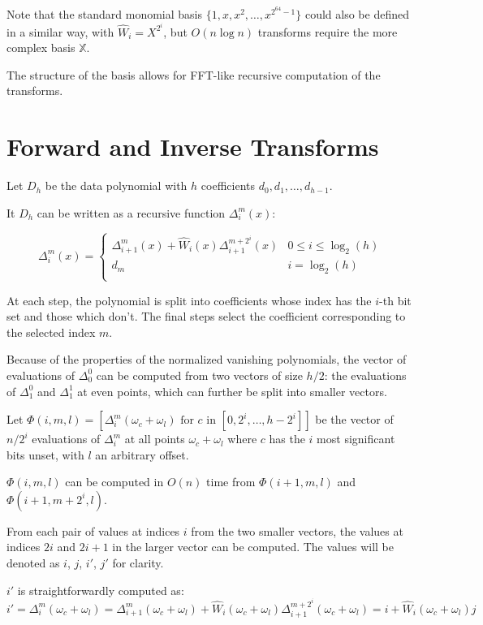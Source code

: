 Note that the standard monomial basis $\{1, x, x^2, \ldots, x^{2^{64} - 1}\}$ could also be defined in a similar way, with $\hat{W}_i = X^{2^{i}}$, but $O(n \log n)$ transforms require the more complex basis $\mathbb{X}$.

The structure of the basis allows for FFT-like recursive computation of the transforms.

\section{Forward and Inverse Transforms}

Let $D_h$ be the data polynomial with $h$ coefficients $d_0, d_1, \ldots, d_{h - 1}$.

It $D_h$ can be written as a recursive function $\Delta_i^m(x)$:

\[
\Delta_i^m(x) = \begin{cases}
    \Delta_{i+1}^m(x) + \hat{W}_i(x) \Delta_{i+1}^{m+2^i}(x) & 0 \leq i \le \log_2(h) \\
    d_m & i = \log_2(h) \\
    \end{cases}
\]

At each step, the polynomial is split into coefficients whose index has the $i$-th bit set and those which don't. The final steps select the coefficient corresponding to the selected index $m$.

Because of the properties of the normalized vanishing polynomials, the vector of evaluations of $\Delta_0^0$ can be computed from two vectors of size $h/2$: the evaluations of $\Delta_1^0$ and $\Delta_1^1$ at even points, which can further be split into smaller vectors.

Let $\Phi(i, m, l) = [\Delta_i^m(\omega_c + \omega_l) \text{ for } c \text{ in } [0, 2^i, \ldots, h - 2^i]]$ be the vector of $n / 2^i$ evaluations of $\Delta_i^m$ at all points $\omega_c + \omega_l$ where $c$ has the $i$ most significant bits unset, with $l$ an arbitrary offset.

$\Phi(i, m, l)$ can be computed in $O(n)$ time from $\Phi(i + 1, m, l)$ and $\Phi(i + 1, m + 2^i, l)$.

From each pair of values at indices $i$ from the two smaller vectors, the values at indices $2i$ and $2i + 1$ in the larger vector can be computed. The values will be denoted as $i$, $j$, $i'$, $j'$ for clarity.

$i'$ is straightforwardly computed as: \[i' = \Delta_i^m(\omega_c + \omega_l) = \Delta_{i+1}^m(\omega_c + \omega_l) + \hat{W}_i(\omega_c + \omega_l) \Delta_{i+1}^{m + 2^i}(\omega_c + \omega_l) = i + \hat{W}_i(\omega_c + \omega_l) j\]


